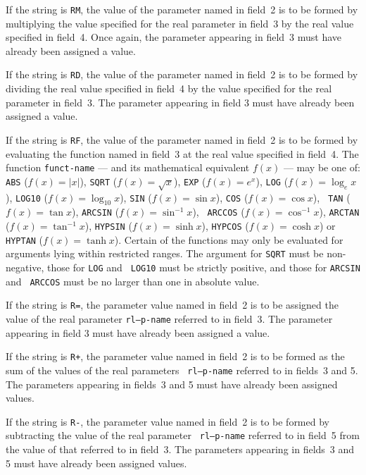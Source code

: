 \documentclass[a4paper]{article}
\begin{document}
If the string is {\tt RM},
the value of the parameter named in field~2
is to  be formed  by multiplying   the  value specified  for  the real
parameter in  field~3  by the real  value  specified in field~4.  Once
again, the  parameter  appearing in field~3   must  have already  been
assigned a value.

If the string is {\tt RD},
the value of the parameter named in field~2
is to be formed by dividing the real value specified in field~4 by the
value  specified  for  the real parameter   in  field~3. The parameter
appearing in field 3 must have already been assigned a value.

If the string is {\tt RF},
the value of the parameter named in field~2
is  to be  formed  by evaluating the function named  in field~3 at the
real value specified in field~4.   The  function {\tt funct-name} ---
and its mathematical  equivalent  $f(x)$ --- may  be one of: {\tt ABS}
($f(x)  = |x|$), {\tt  SQRT} ($f(x) = \sqrt{x}$),  {\tt EXP}  ($f(x) =
e^x$), {\tt LOG} ($f(x) = \log_{e} x$), {\tt LOG10} ($f(x) = \log_{10}
x$), {\tt SIN} ($f(x) = \sin x$),  {\tt COS}  ($f(x) = \cos  x$), {\tt
TAN} ($f(x) =  \tan x$),  {\tt  ARCSIN} ($f(x) = \sin^{-1}  x$),  {\tt
ARCCOS} ($f(x) = \cos^{-1} x$), {\tt  ARCTAN} ($f(x)  =  \tan^{-1} x$),
{\tt HYPSIN} ($f(x) = \sinh  x$), {\tt  HYPCOS}  ($f(x) = \cosh x$) or
{\tt HYPTAN} ($f(x) = \tanh x$).
Certain of the functions may only be
evaluated for arguments  lying within restricted ranges.  The argument
for {\tt SQRT}  must be  non-negative, those for   {\tt LOG} and  {\tt
LOG10} must be strictly positive, and those for {\tt ARCSIN}  and {\tt
ARCCOS} must be no larger than one in absolute value.

If the string is {\tt R=},
the parameter
value named  in field~2 is to
be  assigned the  value of   the  real parameter  {\tt  rl--p-name}
referred to in field~3. The parameter appearing  in field 3  must have
already been assigned a value.

If the string is {\tt R+},
the parameter  value named in field~2 is to
be  formed as the   sum of the   values  of the  real  parameters {\tt
rl--p-name} referred to in fields~3 and 5. The parameters appearing
in fields~3 and 5 must have already been assigned values.

If the string is {\tt R-},
the parameter value named in field~2  is to
be    formed by subtracting    the value of  the real   parameter {\tt
rl--p-name} referred to in field~5 from the value of that referred
to in  field~3. The parameters appearing  in fields~3 and  5 must have
already been assigned values.
\end{document}
